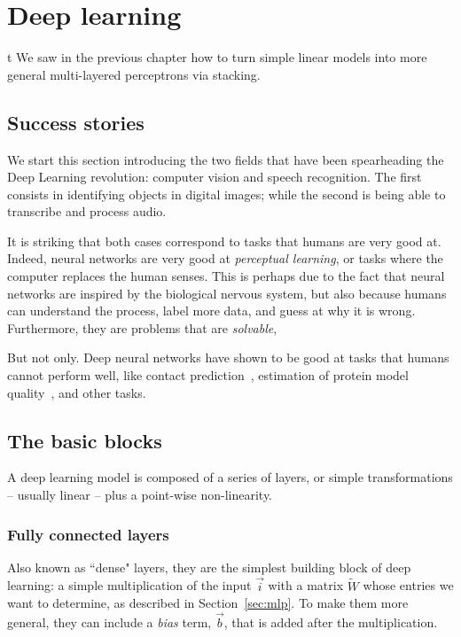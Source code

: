 \chapter{Deep learning}t
We saw in the previous chapter how to turn simple linear models into more general multi-layered perceptrons via stacking.

\section{Success stories}
We start this section introducing the two fields that have been spearheading the Deep Learning revolution: computer vision and speech recognition.
The first consists in identifying objects in digital images; while the second is being able to transcribe and process audio.

It is striking that both cases correspond to tasks that humans are very good at.
Indeed, neural networks are very good at \emph{perceptual learning}, or tasks where the computer replaces the human senses.
This is perhaps due to the fact that neural networks are inspired by the biological nervous system, but also because humans can understand the process,
label more data, and guess at why it is wrong.
Furthermore, they are problems that are \emph{solvable},

But not only.
Deep neural networks have shown to be good at tasks that humans cannot perform well, like contact prediction~\citep{ultra_deep_contacts}, estimation of protein model quality~\citep{casp13_ema}, and other tasks.


\section{The basic blocks}
A deep learning model is composed of a series of layers, or simple transformations -- usually linear -- plus a point-wise non-linearity.


\subsection{Fully connected layers}
Also known as ``dense" layers, they are the simplest building block of deep learning: a simple multiplication of the input $\vec{i}$ with a matrix $\widetilde{W}$ whose entries we want to determine, as described in Section~\ref{sec:mlp}.
To make them more general, they can include a \emph{bias} term, $\vec b$, that is added after the multiplication.

